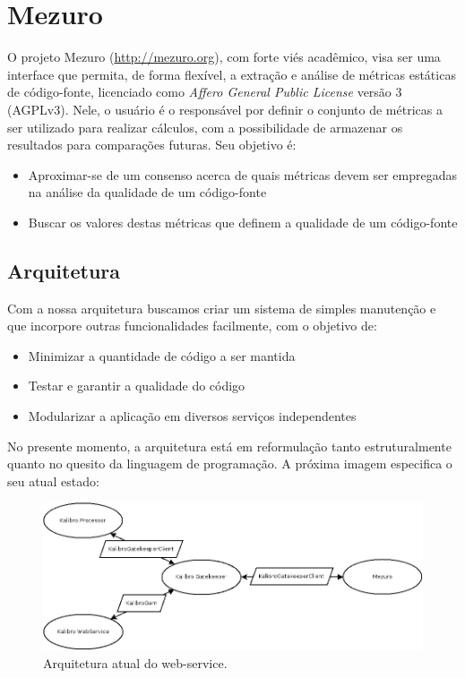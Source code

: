 \documentclass[12pt]{article}
\begin{document}
\section{Mezuro}
O projeto Mezuro (\url{http://mezuro.org}), com forte viés acadêmico, visa ser uma interface que permita, de forma flexível, a extração e análise de métricas estáticas de código-fonte, licenciado como \textit{Affero General Public License} versão 3 (AGPLv3). Nele, o usuário é o responsável por definir o conjunto de métricas a ser utilizado para realizar cálculos, com a possibilidade de armazenar os resultados para comparações futuras. Seu objetivo é:

\begin{itemize}
    \item Aproximar-se de um consenso acerca de quais métricas devem ser empregadas na análise da qualidade de um código-fonte
    \item Buscar os valores destas métricas que definem a qualidade de um código-fonte
\end{itemize}

  \subsection{Arquitetura}
  Com a nossa arquitetura buscamos criar um sistema de simples manutenção e que incorpore outras funcionalidades facilmente, com o objetivo de:
  \begin{itemize}
    \item Minimizar a quantidade de código a ser mantida
    \item Testar e garantir a qualidade do código
    \item Modularizar a aplicação em diversos serviços independentes
  \end{itemize}

  No presente momento, a arquitetura está em reformulação tanto estruturalmente quanto no quesito da linguagem de programação.
  A próxima imagem especifica o seu atual estado:

  \begin{figure}[H]
    \centering
      \includegraphics[scale=0.30]{images/mezuro-architecture-actual.png}
    \caption{Arquitetura atual do web-service.}
    \label{fig:architecture-1}
  \end{figure}
\end{document}
